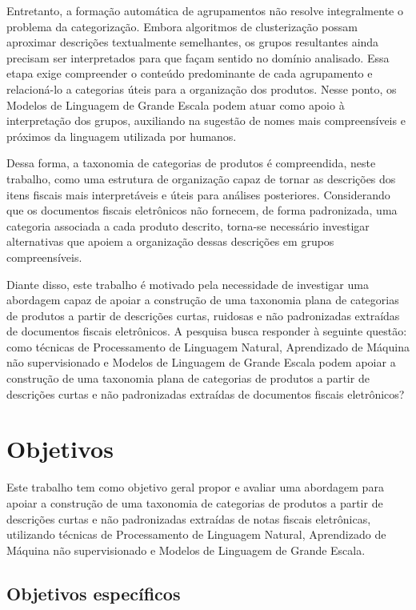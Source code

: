 \documentclass[english,brazilian]{UNISINOSmonografia}
\begin{document}
Entretanto, a formação automática de agrupamentos não resolve integralmente o problema da categorização. Embora algoritmos de clusterização possam aproximar descrições textualmente semelhantes, os grupos resultantes ainda precisam ser interpretados para que façam sentido no domínio analisado. Essa etapa exige compreender o conteúdo predominante de cada agrupamento e relacioná-lo a categorias úteis para a organização dos produtos. Nesse ponto, os Modelos de Linguagem de Grande Escala podem atuar como apoio à interpretação dos grupos, auxiliando na sugestão de nomes mais compreensíveis e próximos da linguagem utilizada por humanos.

Dessa forma, a taxonomia de categorias de produtos é compreendida, neste trabalho, como uma estrutura de organização capaz de tornar as descrições dos itens fiscais mais interpretáveis e úteis para análises posteriores. Considerando que os documentos fiscais eletrônicos não fornecem, de forma padronizada, uma categoria associada a cada produto descrito, torna-se necessário investigar alternativas que apoiem a organização dessas descrições em grupos compreensíveis. 

Diante disso, este trabalho é motivado pela necessidade de investigar uma abordagem capaz de apoiar a construção de uma taxonomia plana de categorias de produtos a partir de descrições curtas, ruidosas e não padronizadas extraídas de documentos fiscais eletrônicos. A pesquisa busca responder à seguinte questão: como técnicas de Processamento de Linguagem Natural, Aprendizado de Máquina não supervisionado e Modelos de Linguagem de Grande Escala podem apoiar a construção de uma taxonomia plana de categorias de produtos a partir de descrições curtas e não padronizadas extraídas de documentos fiscais eletrônicos?



\section{Objetivos}

Este trabalho tem como objetivo geral propor e avaliar uma abordagem para apoiar a construção de uma taxonomia de categorias de produtos a partir de descrições curtas e não padronizadas extraídas de notas fiscais eletrônicas, utilizando técnicas de Processamento de Linguagem Natural, Aprendizado de Máquina não supervisionado e Modelos de Linguagem de Grande Escala.

\subsection{Objetivos específicos}
\end{document}
